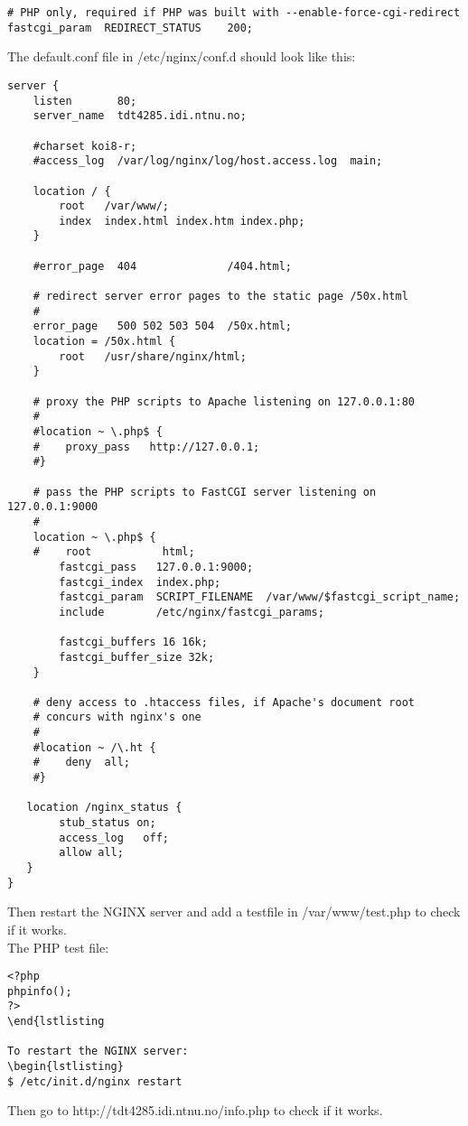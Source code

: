 \begin{itemize}
\begin{lstlisting}
# PHP only, required if PHP was built with --enable-force-cgi-redirect
fastcgi_param  REDIRECT_STATUS    200;
\end{lstlisting}

The default.conf file in /etc/nginx/conf.d should look like this:
\begin{lstlisting}
server {
    listen       80;
    server_name  tdt4285.idi.ntnu.no;

    #charset koi8-r;
    #access_log  /var/log/nginx/log/host.access.log  main;

    location / {
        root   /var/www/;
        index  index.html index.htm index.php;
    }

    #error_page  404              /404.html;

    # redirect server error pages to the static page /50x.html
    #
    error_page   500 502 503 504  /50x.html;
    location = /50x.html {
        root   /usr/share/nginx/html;
    }

    # proxy the PHP scripts to Apache listening on 127.0.0.1:80
    #
    #location ~ \.php$ {
    #    proxy_pass   http://127.0.0.1;
    #}

    # pass the PHP scripts to FastCGI server listening on 127.0.0.1:9000
    #
    location ~ \.php$ {
    #    root           html;
        fastcgi_pass   127.0.0.1:9000;
        fastcgi_index  index.php;
        fastcgi_param  SCRIPT_FILENAME  /var/www/$fastcgi_script_name;
        include        /etc/nginx/fastcgi_params;

        fastcgi_buffers 16 16k;
        fastcgi_buffer_size 32k;
    }

    # deny access to .htaccess files, if Apache's document root
    # concurs with nginx's one
    #
    #location ~ /\.ht {
    #    deny  all;
    #}

   location /nginx_status {
        stub_status on;
        access_log   off;
        allow all;
   }
}
\end{lstlisting}

Then restart the NGINX server and add a testfile in /var/www/test.php to check if it works.\\
The PHP test file:
\begin{lstlisting}
<?php
phpinfo();
?>
\end{lstlisting

To restart the NGINX server:
\begin{lstlisting}
$ /etc/init.d/nginx restart
\end{lstlisting}

Then go to http://tdt4285.idi.ntnu.no/info.php to check if it works. 

\end{itemize}

